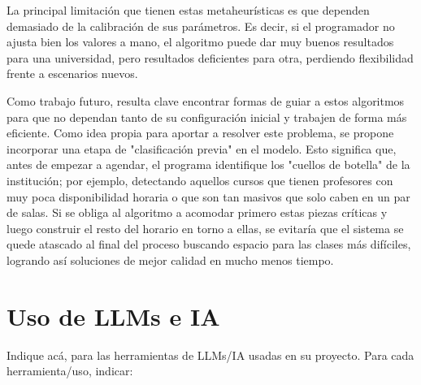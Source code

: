 \documentclass[letter, 10pt]{article}
\begin{document}
La principal limitación que tienen estas metaheurísticas es que dependen demasiado de la calibración de sus parámetros. Es decir, si el programador no ajusta bien los valores a mano, el algoritmo puede dar muy buenos resultados para una universidad, pero resultados deficientes para otra, perdiendo flexibilidad frente a escenarios nuevos.

Como trabajo futuro, resulta clave encontrar formas de guiar a estos algoritmos para que no dependan tanto de su configuración inicial y trabajen de forma más eficiente. Como idea propia para aportar a resolver este problema, se propone incorporar una etapa de "clasificación previa" en el modelo. Esto significa que, antes de empezar a agendar, el programa identifique los "cuellos de botella" de la institución; por ejemplo, detectando aquellos cursos que tienen profesores con muy poca disponibilidad horaria o que son tan masivos que solo caben en un par de salas. Si se obliga al algoritmo a acomodar primero estas piezas críticas y luego construir el resto del horario en torno a ellas, se evitaría que el sistema se quede atascado al final del proceso buscando espacio para las clases más difíciles, logrando así soluciones de mejor calidad en mucho menos tiempo.

\section{Uso de LLMs e IA}
Indique acá, para las herramientas de LLMs/IA usadas en su proyecto. Para cada herramienta/uso, indicar:
\end{document}
